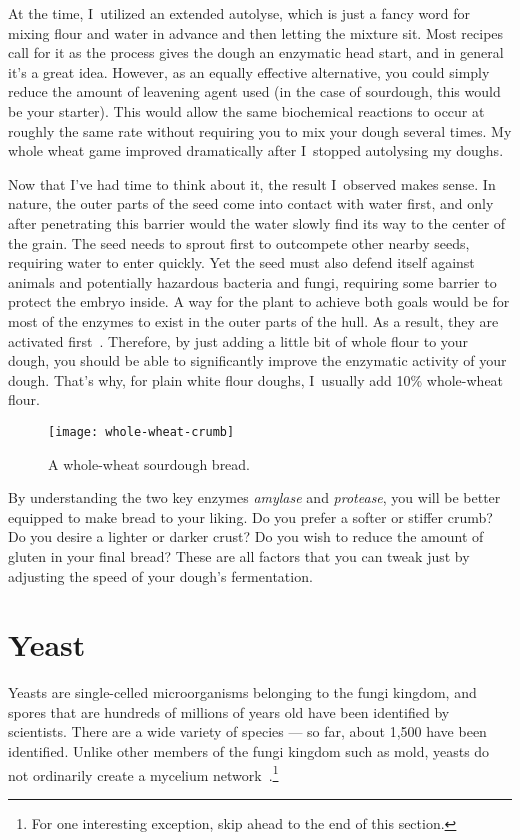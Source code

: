 At the time, I~utilized an extended autolyse, which is just a fancy word for
mixing flour and water in advance and then letting the mixture sit. Most
recipes call for it as the process gives the dough an enzymatic head start, and
in general it's a great idea. However, as an equally effective alternative,
you could simply reduce the amount of leavening agent used (in the case of
sourdough, this would be your starter). This would allow the same biochemical
reactions to occur at roughly the same rate without requiring you to mix your
dough several times. My whole wheat game improved dramatically after I~stopped
autolysing my doughs.

Now that I've had time to think about it, the result I~observed makes sense.
In nature, the outer parts of the seed come into contact with water first, and
only after penetrating this barrier would the water slowly find its way to the
center of the grain. The seed needs to sprout first to outcompete other nearby
seeds, requiring water to enter quickly. Yet the seed must also defend itself
against animals and potentially hazardous bacteria and fungi, requiring some
barrier to protect the embryo inside. A way for the plant to achieve both goals
would be for most of the enzymes to exist in the outer parts of the hull. As a
result, they are activated first~\cite{enzymatic+activity+whole+wheat}. Therefore, by just adding a
little bit of whole flour to your dough, you should be able to significantly
improve the enzymatic activity of your dough. That's why, for plain white flour
doughs, I~usually add 10\% whole-wheat flour.

\begin{figure}
  \texttt{[image: whole-wheat-crumb]}
  \caption{A whole-wheat sourdough bread.}%
  \label{whole-wheat-crumb}
\end{figure}


By understanding the two key enzymes \emph{amylase} and \emph{protease}, you
will be better equipped to make bread to your liking. Do you prefer a softer
or stiffer crumb? Do you desire a lighter or darker crust? Do you wish to reduce
the amount of gluten in your final bread? These are all factors that you can
tweak just by adjusting the speed of your dough's fermentation.

\section{Yeast}

Yeasts are single-celled microorganisms belonging to the fungi kingdom, and
spores that are hundreds of millions of years old have been identified by
scientists. There are a wide variety of species --- so far, about 1,500 have been
identified. Unlike other members of the fungi kingdom such as mold, yeasts do
not ordinarily create a mycelium network~\cite{molecular+mechanisms+yeast}.\footnote{For
one interesting exception, skip ahead to the end of this section.}

